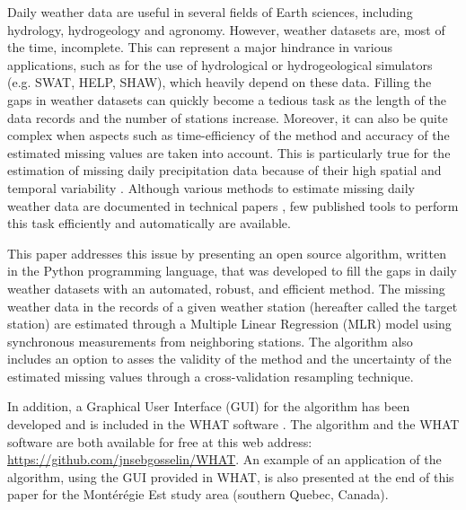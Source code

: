 \documentclass[TechnicalNoteMeteo.tex]{subfiles}
\begin{document}
Daily weather data are useful in several fields of Earth sciences, including hydrology, hydrogeology and agronomy. However, weather datasets are, most of the time, incomplete. This can represent a major hindrance in various applications, such as for the use of hydrological or hydrogeological simulators (e.g. SWAT, HELP, SHAW), which heavily depend on these data. Filling the gaps in weather datasets can quickly become a tedious task as the length of the data records and the number of stations increase. Moreover, it can also be quite complex when aspects such as time-efficiency of the method and accuracy of the estimated missing values are taken into account. This is particularly true for the estimation of missing daily precipitation data because of their high spatial and temporal variability \citep{simolo_improving_2010}. Although various methods to estimate missing daily weather data are documented in technical papers \citep[i.e.][]{degaetano_method_1995, simolo_improving_2010}, few published tools to perform this task efficiently and automatically are available.

This paper addresses this issue by presenting an open source algorithm, written in the Python programming language, that was developed to fill the gaps in daily weather datasets with an automated, robust, and efficient method. The missing weather data in the records of a given weather station (hereafter called the target station) are estimated through a Multiple Linear Regression (MLR) model using synchronous measurements from neighboring stations. The algorithm also includes an option to asses the validity of the method and the uncertainty of the estimated missing values through a cross-validation resampling technique. 
 
In addition, a Graphical User Interface (GUI) for the algorithm has been developed and is included in the WHAT software \citep{gosselin_what_2015}. The algorithm and the WHAT software are both available for free at this web address: \url{https://github.com/jnsebgosselin/WHAT}. An example of an application of the algorithm, using the GUI provided in WHAT, is also presented at the end of this paper for the Mont\'er\'egie Est study area (southern Quebec, Canada).
\end{document}
